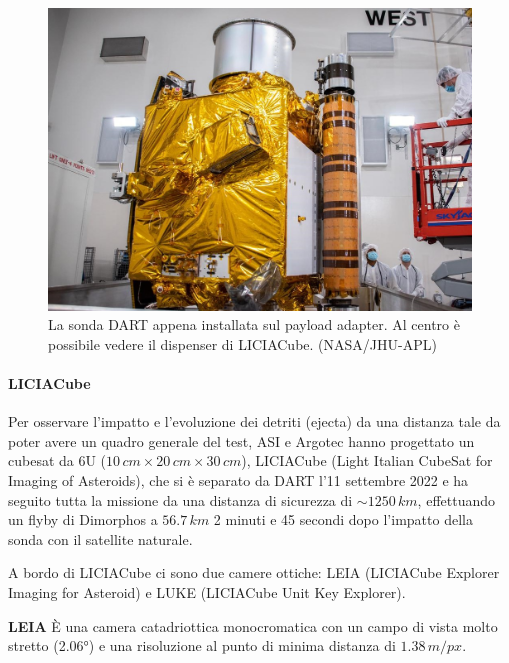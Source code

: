 \begin{figure}
    \centering
    \includegraphics[scale=0.26]{figure/dart_cleanroom.jpg}
    \caption[La sonda DART nella clean room.]{La sonda DART appena installata sul payload adapter. Al centro è possibile vedere il dispenser di LICIACube. (NASA/JHU-APL)}
    \label{fig:dart_cleanroom}
\end{figure}

\paragraph*{LICIACube}
Per osservare l'impatto e l'evoluzione dei detriti (ejecta) da una distanza tale da poter avere un quadro generale del test, ASI e Argotec hanno progettato un cubesat da 6U ($10\,cm\times 20\,cm\times 30\,cm$), LICIACube (Light Italian CubeSat for Imaging of Asteroids), che si è separato da DART l'11 settembre 2022 e ha seguito tutta la missione da una distanza di sicurezza di $\sim 1250\,km$, effettuando un flyby di Dimorphos a $56.7\,km$ 2 minuti e 45 secondi dopo l'impatto della sonda con il satellite naturale.

A bordo di LICIACube ci sono due camere ottiche: LEIA (LICIACube Explorer Imaging for Asteroid) e LUKE (LICIACube Unit Key Explorer).

\qquad \small{\textbf{LEIA}} È una camera catadriottica monocromatica con un campo di vista molto stretto (2.06°) e una risoluzione al punto di minima distanza di $1.38\,m/px$.

